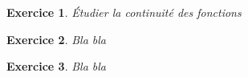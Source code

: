 \documentclass[12pt]{article}
\newtheorem{Exo}{Exercice}
\newenvironment{ex}{\begin{Exo}\normalfont}{\end{Exo}}
\begin{document}
\begin{ex}
	\'Etudier la continuit\'e des fonctions
\end{ex}

\begin{ex}
	Bla bla
\end{ex}

\begin{ex}
	Bla bla
\end{ex}
\end{document}
